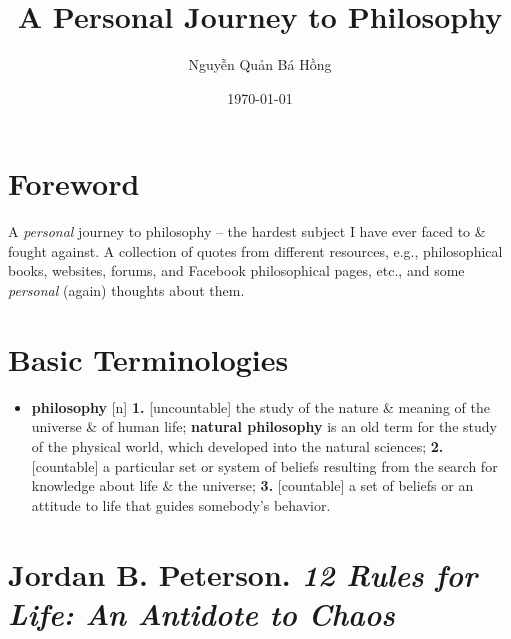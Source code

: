 \documentclass[oneside]{book}
\title{A Personal Journey to Philosophy}
\author{Nguyễn Quản Bá Hồng}
\date{\today}
\numberwithin{equation}{section}
\begin{document}
\maketitle
{}
\tableofcontents


\chapter*{Foreword}

A \textit{personal} journey to philosophy -- the hardest subject I have ever faced to \& fought against. A collection of quotes from different resources, e.g., philosophical books, websites, forums, and Facebook philosophical pages, etc., and some \textit{personal} (again) thoughts about them.


\chapter*{Basic Terminologies}
\begin{itemize}
	\item \textbf{philosophy} [n] \textbf{1.} [uncountable] the study of the nature \& meaning of the universe \& of human life; \textbf{natural philosophy} is an old term for the study of the physical world, which developed into the natural sciences; \textbf{2.} [countable] a particular set or system of beliefs resulting from the search for knowledge about life \& the universe; \textbf{3.} [countable] a set of beliefs or an attitude to life that guides somebody's behavior.
\end{itemize}


\chapter{Jordan B. Peterson. \textit{12 Rules for Life: An Antidote to Chaos}}
\end{document}
